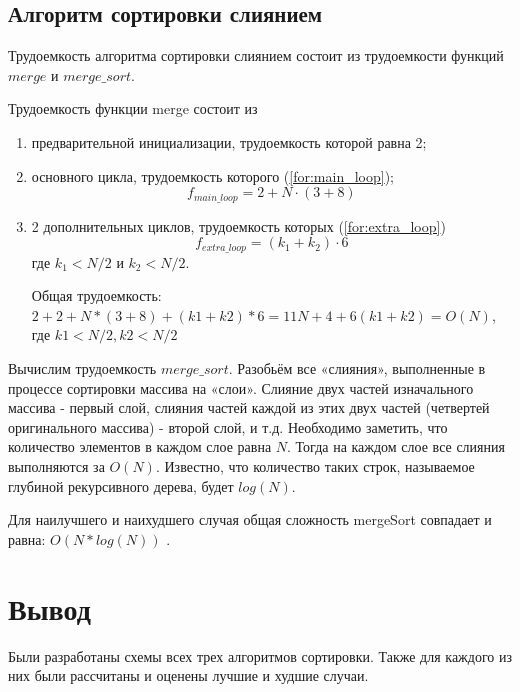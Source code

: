 \subsection{Алгоритм сортировки слиянием}

Трудоемкость алгоритма сортировки слиянием состоит из трудоемкости функций $merge$ и $merge\_sort$.

Трудоемкость функции merge состоит из
\begin{enumerate}[label=\arabic*)]
	\item предварительной инициализации, трудоемкость которой равна 2;
	\item основного цикла, трудоемкость которого (\ref{for:main_loop});
	\begin{equation}
		\label{for:main_loop}
		f_{main\_loop} = 2 + N\cdot(3 + 8)
	\end{equation}
	\item 2 дополнительных циклов, трудоемкость которых (\ref{for:extra_loop})
	\begin{equation}
		\label{for:extra_loop}
		f_{extra\_loop} = (k_1 + k_2)\cdot6
	\end{equation}
	где $k_1 < N/2$ и $k_2 < N/2$.
	
	Общая трудоемкость:  $2 + 2 + N * (3 + 8) + (k1 + k2) * 6 = 11N + 4  + 6(k1 + k2) = O(N)$, где $k1 < N/2, k2  < N/2$
\end{enumerate}

Вычислим трудоемкость $merge\_sort$. Разобьём все «слияния», выполненные в процессе сортировки массива на «слои». Слияние двух частей изначального массива - первый слой, слияния частей каждой из этих двух частей (четвертей оригинального массива) - второй слой, и т.д. Необходимо заметить, что количество элементов в каждом слое равна $N$. Тогда на каждом слое все слияния выполняются за $O(N)$. Известно, что количество таких строк, называемое глубиной рекурсивного дерева, будет $log(N)$.

Для наилучшего и наихудшего случая общая сложность mergeSort совпадает и равна: $O(N * log(N))$ \cite{algos}.


\section*{Вывод}

Были разработаны схемы всех трех алгоритмов сортировки. Также для каждого из них были рассчитаны и оценены лучшие и худшие случаи.
